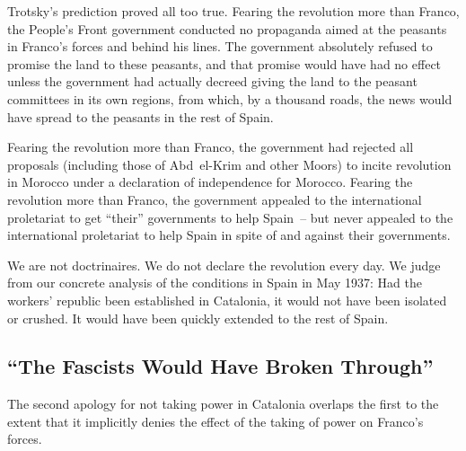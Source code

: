 Trotsky’s prediction proved all too true. Fearing the revolution more than Franco, the People’s Front government conducted no propaganda aimed at the peasants in Franco’s forces and behind his lines. The government absolutely refused to promise the land to these peasants, and that promise would have had no effect unless the government had actually decreed giving the land to the peasant committees in its own regions, from which, by a thousand roads, the news would have spread to the peasants in the rest of Spain.

Fearing the revolution more than Franco, the government had rejected all proposals (including those of Abd~el-Krim and other Moors) to incite revolution in Morocco under a declaration of independence for Morocco. Fearing the revolution more than Franco, the government appealed to the international proletariat to get ``their'' governments to help Spain~-- but never appealed to the international proletariat to help Spain in spite of and against their governments.

We are not doctrinaires. We do not declare the revolution every day. We judge from our concrete analysis of the conditions in Spain in May 1937: Had the workers’ republic been established in Catalonia, it would not have been isolated or crushed. It would have been quickly extended to the rest of Spain.

\subsection*{``The Fascists Would Have Broken Through''}

The second apology for not taking power in Catalonia overlaps the first to the extent that it implicitly denies the effect of the taking of power on Franco’s forces.

